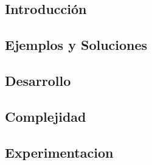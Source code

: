 \subsection{Introducci\'on} 





\subsection{Ejemplos y Soluciones}

\subsection{Desarrollo}

\subsection{Complejidad}

\subsection{Experimentacion}
